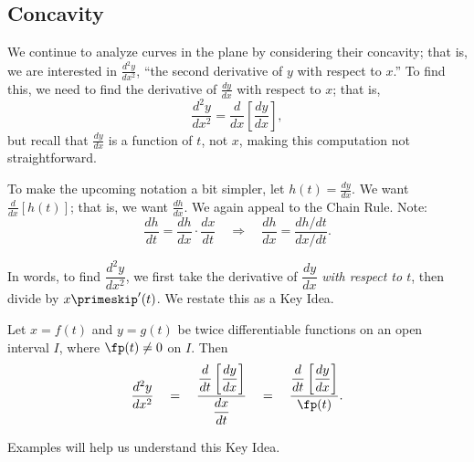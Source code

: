 \subsection{Concavity}

We continue to analyze curves in the plane by considering their concavity; that is, we are interested in $\frac{d^2y}{dx^2}$, ``the second derivative of $y$ with respect to $x$.'' To find this, we need to find the derivative of $\frac{dy}{dx}$ with respect to $x$; that is,
\[\frac{d^2y}{dx^2}=\frac{d}{dx}\left[\frac{dy}{dx}\right],\]
but recall that $\frac{dy}{dx}$ is a function of $t$, not $x$, making this computation not straightforward. 

To make the upcoming notation a bit simpler, let $h(t) = \frac{dy}{dx}$. We want $\frac{d}{dx}[h(t)]$; that is, we want $\frac{dh}{dx}$. We again appeal to the Chain Rule. Note:
\[
\frac{dh}{dt} = \frac{dh}{dx}\cdot\frac{dx}{dt}
\quad \Rightarrow \quad
\frac{dh}{dx} = \frac{dh/dt}{dx/dt}.
\]

In words, to find $\dfrac{d^2y}{dx^2}$, we first take the derivative of $\dfrac{dy}{dx}$ \emph{with respect to $t$}, then divide by $x\primeskip'(t)$. We restate this as a Key Idea.

\begin{keyidea}\label{idea:second_der_par}
Let $x=f(t)$ and $y=g(t)$ be twice differentiable functions on an open interval $I$, where $\fp(t)\neq 0$ on $I$. Then 
\[
\frac{d^2y}{dx^2}
\quad = \quad
\frac{\dfrac{d}{dt}\left[\dfrac{dy}{dx}\right]}{\dfrac{dx}{dt}}
\quad=\quad
\frac{\dfrac{d}{dt}\left[\dfrac{dy}{dx}\right]}{\fp(t)}.
\] 
\end{keyidea}

Examples will help us understand this Key Idea.

